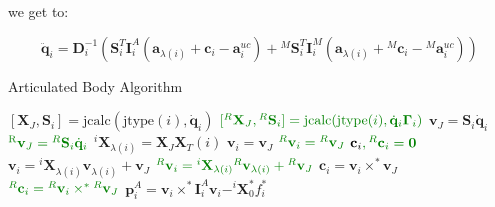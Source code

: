 we get to:

\begin{equation}
    \ddot{\mathbf{q}} _i = \mathbf{D} _i ^{-1} (\mathbf{S} ^T _i \mathbf{I} ^A _i (\mathbf{a} _{\lambda (i)} + \mathbf{c} _i - \mathbf{a} ^{uc} _i) + {} ^M \mathbf{S} ^T _i \mathbf{I} ^M _i ( \mathbf{a} _{\lambda (i)} + {} ^M \mathbf{c} _i - {} ^M \mathbf{a} ^{uc} _i))
\end{equation}

\begin{algorithm}[H]
    \caption{Articulated Body Algorithm}
    \label{alg:aba}
    \begin{algorithmic}[1]
        \STATE $[\mathbf{X}_J, \mathbf{S}_i] = \text{jcalc}(\text{jtype}(i), \dot{\mathbf{q}}_i)$
        \STATE $\color{webgreen}{[{} ^R\mathbf{X}_J, {} ^R\mathbf{S}_i] = \text{jcalc}(\text{jtype}(i), \dot{\mathbf{q}}_i \boldsymbol{\Gamma} _i)}$
        \STATE $\mathrm{\mathbf{v}}_J = \mathbf{S}_i \dot{\mathbf{q}}_i$
        \STATE $\color{webgreen}{\mathrm{{} ^R\mathbf{v}}_J = {} ^R\mathbf{S}_i \dot{\mathbf{q}}_i}$
        \STATE $^i\mathbf{X}_{\lambda(i)} = \mathbf{X}_J\mathbf{X}_T (i)$
        \STATE $\mathrm{\mathbf{v}}_i = \mathrm{\mathbf{v}}_J$
        \STATE $\color{webgreen}{{}^R\mathrm{\mathbf{v}}_i = {}^R\mathrm{\mathbf{v}}_J}$
        \STATE $\mathbf{c}_i \color{webgreen}{,{}^R\mathbf{c}_i} = \mathbf{0}$
        \ELSE
        \STATE $\mathrm{\mathbf{v}}_i = {}^i\mathbf{X} _{\lambda(i)}\mathrm{\mathbf{v}}_{\lambda(i)} + \mathrm{\mathbf{v}}_J$
        \STATE $\color{webgreen}{{}^R\mathrm{\mathbf{v}}_i =  {}^i\mathbf{X} _{\lambda(i)} {}^R\mathrm{\mathbf{v}}_{\lambda(i)} + {}^R\mathrm{\mathbf{v}}_J}$
        \STATE $\mathbf{c}_i = \mathrm{\mathbf{v}}_i \times ^* \mathrm{\mathbf{v}}_J$
        \STATE $\color{webgreen}{{}^R\mathbf{c}_i = {}^R\mathrm{\mathbf{v}}_i \times ^* {}^R\mathrm{\mathbf{v}}_J}$
        \ENDIF
        \STATE $\mathbf{p}_i ^A = \mathrm{\mathbf{v}}_i \times^* \mathbf{I}_i ^A \mathrm{\mathbf{v}}_i - ^i\mathbf{X} _0 ^* f ^* _i $
        \STATE {}
        \ENDFOR


\end{algorithmic}
\end{algorithm}
